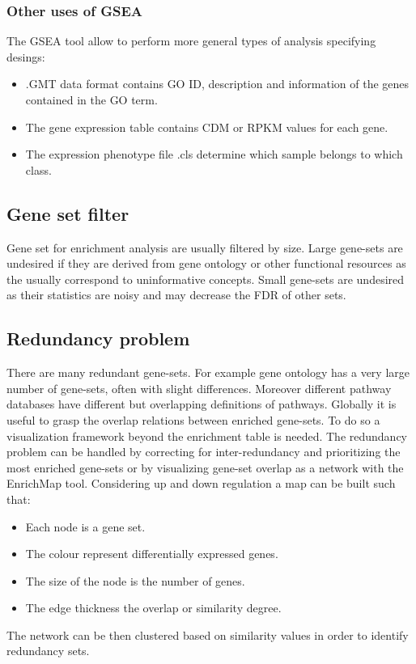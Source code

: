 		\subsubsection{Other uses of GSEA}
		The GSEA tool allow to perform more general types of analysis specifying desings:

		\begin{multicols}{2}
			\begin{itemize}
				\item .GMT data format contains GO ID, description and information of the genes contained in the GO term.
				\item The gene expression table contains CDM or RPKM values for each gene.
				\item The expression phenotype file .cls determine which sample belongs to which class.
			\end{itemize}
		\end{multicols}

	\subsection{Gene set filter}
	Gene set for enrichment analysis are usually filtered by size.
	Large gene-sets are undesired if they are derived from gene ontology or other functional resources as the usually correspond to uninformative concepts.
	Small gene-sets are undesired as their statistics are noisy and may decrease the FDR of other sets.

	\subsection{Redundancy problem}
	There are many redundant gene-sets.
	For example gene ontology has a very large number of gene-sets, often with slight differences.
	Moreover different pathway databases have different but overlapping definitions of pathways.
	Globally it is useful to grasp the overlap relations between enriched gene-sets.
	To do so a visualization framework beyond the enrichment table is needed.
	The redundancy problem can be handled by correcting for inter-redundancy and prioritizing the most enriched gene-sets or by visualizing gene-set overlap as a network with the EnrichMap tool.
	Considering up and down regulation a map can be built such that:

	\begin{multicols}{2}
		\begin{itemize}
			\item Each node is a gene set.
			\item The colour represent differentially expressed genes.
			\item The size of the node is the number of genes.
			\item The edge thickness the overlap or similarity degree.
		\end{itemize}
	\end{multicols}

	The network can be then clustered based on similarity values in order to identify redundancy sets.
